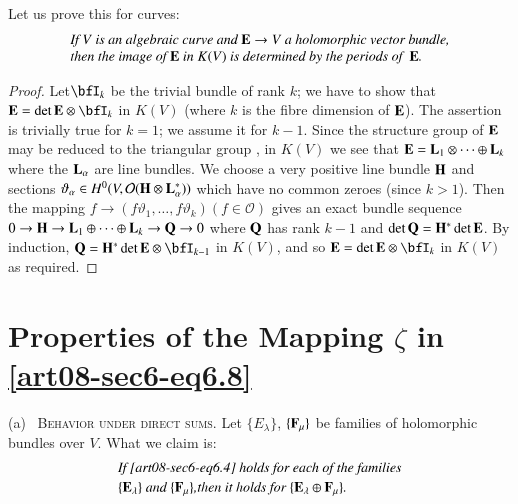 Let us prove this for curves:
\begin{equation}
\begin{array}{l}
\text{\em If $V$ is an algebraic curve and $\mathbf{E}\to V$ a holomorphic vector bundle,}\\
\text{\em then the image of $\mathbf{E}$ in $K(V)$ is determined by the periods of~ $\mathbf{E}$.}
\end{array}\label{art08-sec6-eq6.14}
\end{equation}

\begin{proof}
Let\pageoriginale $\bfI_{k}$ be the trivial bundle of rank $k$; we have to show that $\bfE=\det \bfE\otimes \bfI_{k}$ in $K(V)$ (where $k$ is the fibre dimension of $\mathbf{E}$). The assertion is trivially true for $k=1$; we assume it for $k-1$. Since the structure group of $\mathbf{E}$ may be reduced to the triangular group \cite{art08-key2}, in $K(V)$ we see that $\mathbf{E}=\mathbf{L}_{1}\otimes\cdots\oplus \mathbf{L}_{k}$ where the $\mathbf{L}_{\alpha}$ are line bundles. We choose a very positive line bundle $\mathbf{H}$ and sections $\vartheta_{\alpha}\in H^{0}(V,\mathcal{O}(\mathbf{H}\otimes \mathbf{L}^{*}_{\alpha}))$ which have no common zeroes (since $k>1$). Then the mapping $f\to (f\vartheta_{1},\ldots,f\vartheta_{k})(f\in \mathcal{O})$ gives an exact bundle sequence $0\to \mathbf{H}\to \mathbf{L}_{1}\oplus\cdots\oplus \mathbf{L}_{k}\to \mathbf{Q}\to 0$ where $\mathbf{Q}$ has rank $k-1$ and $\det \mathbf{Q}=\mathbf{H}^{*}\det \mathbf{E}$. By induction, $\bfQ=\bfH^{*}\det \bfE\otimes \bfI_{k-1}$ in $K(V)$, and so $\bfE=\det \bfE\otimes \bfI_{k}$ in $K(V)$ as required.
\end{proof}

\section{Properties of the Mapping $\zeta$ in \eqref{art08-sec6-eq6.8}}\label{art08-sec6-eq6.8}

(a)~ \textsc{Behavior under direct sums.} Let $\{E_{\lambda}\}$, $\{\mathbf{F}_{\mu}\}$ be families of holomorphic bundles over $V$. What we claim is:
\setcounter{equation}{0}
\begin{equation}
\begin{array}{l}
\text{\em If \eqref{art08-sec6-eq6.4} holds for each of the families}\\[2pt]
\text{\em $\{\mathbf{E}_{\lambda}\}$ and $\{\mathbf{F}_{\mu}\}$,then it holds for $\{\mathbf{E}_{\lambda}\oplus \mathbf{F}_{\mu}\}$.}
\end{array}\label{art08-sec7-eq7.1}
\end{equation}

